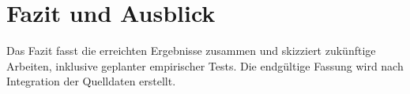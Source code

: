 \section{Fazit und Ausblick}
Das Fazit fasst die erreichten Ergebnisse zusammen und skizziert
zuk\"unftige Arbeiten, inklusive geplanter empirischer Tests.
Die endg\"ultige Fassung wird nach Integration der Quelldaten erstellt.
